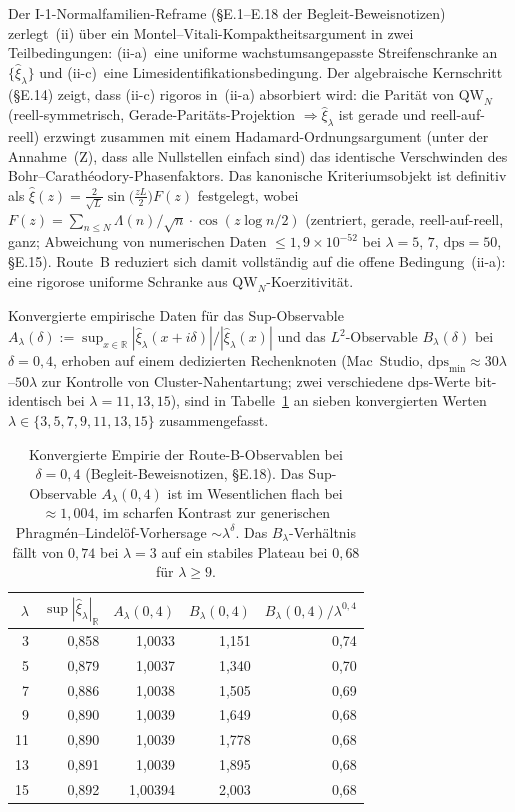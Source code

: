 \documentclass[12pt,a4paper]{article}
\theoremstyle{definition}
\theoremstyle{remark}
\begin{document}
Der I-1-Normalfamilien-Reframe (\S E.1--E.18 der Begleit-Beweisnotizen) zerlegt~(ii) über ein Montel--Vitali-Kompaktheitsargument in zwei Teilbedingungen:
(ii-a)~eine uniforme wachstumsangepasste Streifenschranke an $\{\hat\xi_\lambda\}$ und
(ii-c)~eine Limesidentifikationsbedingung.
Der algebraische Kernschritt (\S E.14) zeigt, dass (ii-c) rigoros in~(ii-a) absorbiert wird: die Parität von $\mathrm{QW}_N$ (reell-symmetrisch, Gerade-Paritäts-Projektion $\Rightarrow \hat\xi_\lambda$ ist gerade und reell-auf-reell) erzwingt zusammen mit einem Hadamard-Ordnungsargument (unter der Annahme~(Z), dass alle Nullstellen einfach sind) das identische Verschwinden des Bohr--Carathéodory-Phasenfaktors.
Das kanonische Kriteriumsobjekt ist definitiv als
$\hat\xi(z) = \tfrac{2}{\sqrt{L}}\sin\!\bigl(\tfrac{zL}{2}\bigr)F(z)$
festgelegt, wobei $F(z) = \sum_{n \leq N} \Lambda(n)/\sqrt{n}\cdot\cos(z\log n/2)$
(zentriert, gerade, reell-auf-reell, ganz; Abweichung von numerischen Daten
$\leq 1{,}9 \times 10^{-52}$ bei $\lambda = 5$, $7$, $\mathrm{dps}=50$, \S E.15).
Route~B reduziert sich damit vollständig auf die offene Bedingung~(ii-a): eine rigorose uniforme Schranke aus $\mathrm{QW}_N$-Koerzitivität.

Konvergierte empirische Daten für das Sup-Observable
$A_\lambda(\delta) := \sup_{x\in\mathbb{R}} |\hat\xi_\lambda(x+i\delta)|/|\hat\xi_\lambda(x)|$
und das $L^2$-Observable $B_\lambda(\delta)$ bei $\delta = 0{,}4$, erhoben auf einem dedizierten Rechenknoten
(Mac~Studio, $\mathrm{dps}_{\min} \approx 30\lambda$--$50\lambda$
zur Kontrolle von Cluster-Nahentartung; zwei verschiedene dps-Werte bit-identisch bei $\lambda = 11, 13, 15$),
sind in Tabelle~\ref{tab:route-b-empirics} an sieben konvergierten Werten
$\lambda \in \{3, 5, 7, 9, 11, 13, 15\}$ zusammengefasst.

\begin{table}[h]
\centering
\small
\begin{tabular}{r r r r r}
\hline
$\lambda$ & $\sup|\hat\xi_\lambda|_{\mathbb{R}}$ & $A_\lambda(0{,}4)$ & $B_\lambda(0{,}4)$ & $B_\lambda(0{,}4)/\lambda^{0{,}4}$ \\
\hline
 3 & 0{,}858 & 1{,}0033  & 1{,}151 & 0{,}74 \\
 5 & 0{,}879 & 1{,}0037  & 1{,}340 & 0{,}70 \\
 7 & 0{,}886 & 1{,}0038  & 1{,}505 & 0{,}69 \\
 9 & 0{,}890 & 1{,}0039  & 1{,}649 & 0{,}68 \\
11 & 0{,}890 & 1{,}0039  & 1{,}778 & 0{,}68 \\
13 & 0{,}891 & 1{,}0039  & 1{,}895 & 0{,}68 \\
15 & 0{,}892 & 1{,}00394 & 2{,}003 & 0{,}68 \\
\hline
\end{tabular}
\caption{Konvergierte Empirie der Route-B-Observablen bei $\delta = 0{,}4$
(Begleit-Beweisnotizen, \S E.18). Das Sup-Observable $A_\lambda(0{,}4)$ ist
im Wesentlichen flach bei $\approx 1{,}004$, im scharfen Kontrast zur
generischen Phragmén--Lindelöf-Vorhersage $\sim \lambda^\delta$. Das
$B_\lambda$-Verhältnis fällt von $0{,}74$ bei $\lambda = 3$ auf ein stabiles
Plateau bei $0{,}68$ für $\lambda \geq 9$.}
\label{tab:route-b-empirics}
\end{table}
\end{document}
